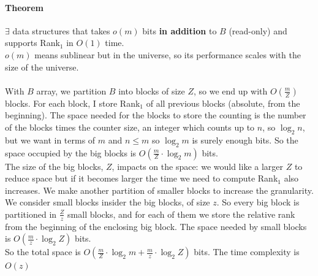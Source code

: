 \documentclass[10pt]{report}
\begin{document}
\paragraph{Theorem} $\exists$ data structures that takes $o(m)$ bits \textbf{in addition} to $B$ (read-only) and supports Rank$_1$ in $O(1)$ time.\\
$o(m)$ means sublinear but in the universe, so its performance scales with the size of the universe.\\\\
With $B$ array, we partition $B$ into blocks of size $Z$, so we end up with $O\left(\frac{m}{Z}\right)$ blocks. For each block, I store Rank$_1$ of all previous blocks (absolute, from the beginning). The space needed for the blocks to store the counting is the number of the blocks times the counter size, an integer which counts up to $n$, so $\log_2 n$, but we want in terms of $m$ and $n\leq m$ so $\log_2 m$ is surely enough bits. So the space occupied by the big blocks is $O\left(\frac{m}{Z}\cdot \log_2 m\right)$ bits.\\
The size of the big blocks, $Z$, impacts on the space: we would like a larger $Z$ to reduce space but if it becomes larger the time we need to compute Rank$_1$ also increases. We make another partition of smaller blocks to increase the granularity. We consider small blocks insider the big blocks, of size $z$. So every big block is partitioned in $\frac{Z}{z}$ small blocks, and for each of them we store the relative rank from the beginning of the enclosing big block. The space needed by small blocks is $O\left(\frac{m}{z}\cdot\log_2 Z\right)$ bits.\\
So the total space is $O\left(\frac{m}{Z}\cdot\log_2 m + \frac{m}{z}\cdot\log_2 Z\right)$ bits. The time complexity is $O(z)$ %
\end{document}
